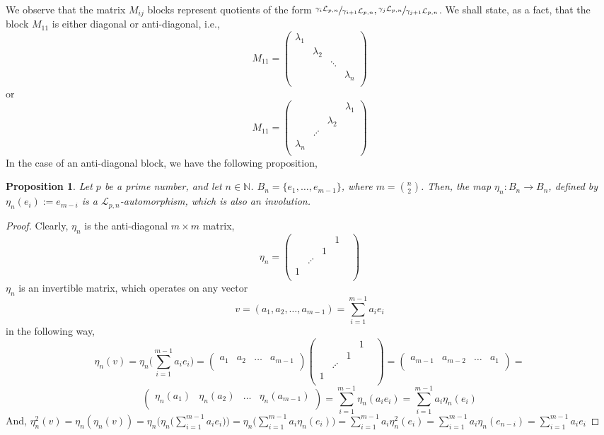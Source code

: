 \documentclass[12pt]{article}
\newtheorem{proposition}[theorem]{Proposition}
\begin{document}
We observe that the matrix $M_{ij}$ blocks represent quotients of the form $\sfrac{\gamma_i\mathcal{L}_{p,n}}{\gamma_{i+1}\mathcal{L}_{p,n}},\sfrac{\gamma_j\mathcal{L}_{p,n}}{\gamma_{j+1}\mathcal{L}_{p,n}}$. We shall state, as a fact, that the block $M_{11}$ is either diagonal or anti-diagonal, i.e., $$M_{11}=\begin{pmatrix}
\lambda_1 & & &\\
& \lambda_2 & &\\
& & \ddots &\\
& & & \lambda_n\\
\end{pmatrix}$$
or
$$M_{11}=\begin{pmatrix}
& & & \lambda_1\\
& & \lambda_2 &\\
& \iddots & &\\
\lambda_n & & &\\
\end{pmatrix}$$
In the case of an anti-diagonal block, we have the following proposition,
\begin{proposition}
\label{prop.involution}
Let $p$ be a prime number, and let $n\in\mathbb{N}$. $B_n=\{e_1,\dots,e_{m-1}\}$, where $m=\binom{n}{2}$. Then, the map $\eta_n:B_n\rightarrow B_n$, defined by $\eta_n(e_i):=e_{m-i}$ is a $\mathcal{L}_{p,n}$-automorphism, which is also an involution.
\end{proposition}
\begin{proof}
Clearly, $\eta_n$ is the anti-diagonal $m\times m$ matrix,$$
\eta_n=\begin{pmatrix}
& & & 1 &\\
& & 1 &\\
& \iddots & &\\
1 & & &\\
\end{pmatrix}
$$
$\eta_n$ is an invertible matrix, which operates on any vector $$v=(a_1,a_2,\dots,a_{m-1})=\sum_{i=1}^{m-1}a_ie_i$$ in the following way,$$
\eta_n(v)=\eta_n\bigg(\sum_{i=1}^{m-1}a_ie_i\bigg)=\begin{pmatrix}
a_1 & a_2 & \dots & a_{m-1}\\
\end{pmatrix}\begin{pmatrix}
& & & 1 &\\
& & 1 &\\
& \iddots & &\\
1 & & &\\
\end{pmatrix}=\begin{pmatrix}
a_{m-1} & a_{m-2} & \dots & a_1\\
\end{pmatrix}=$$
$$\begin{pmatrix}
\eta_n(a_1) & \eta_n(a_2) & \dots & \eta_n(a_{m-1})\\
\end{pmatrix}=\sum_{i=1}^{m-1}\eta_n(a_ie_i)=\sum_{i=1}^{m-1}a_i\eta_n(e_i)
$$
And, $\eta_n^2(v)=\eta_n(\eta_n(v))=\eta_n\bigg(\eta_n\bigg(\sum_{i=1}^{m-1}a_ie_i\bigg)\bigg)=\eta_n\bigg(\sum_{i=1}^{m-1}a_i\eta_n(e_i)\bigg)=\sum_{i=1}^{m-1}a_i\eta_n^2(e_i)=\sum_{i=1}^{m-1}a_i\eta_n(e_{n-i})=\sum_{i=1}^{m-1}a_ie_i$
\end{proof}
\end{document}
